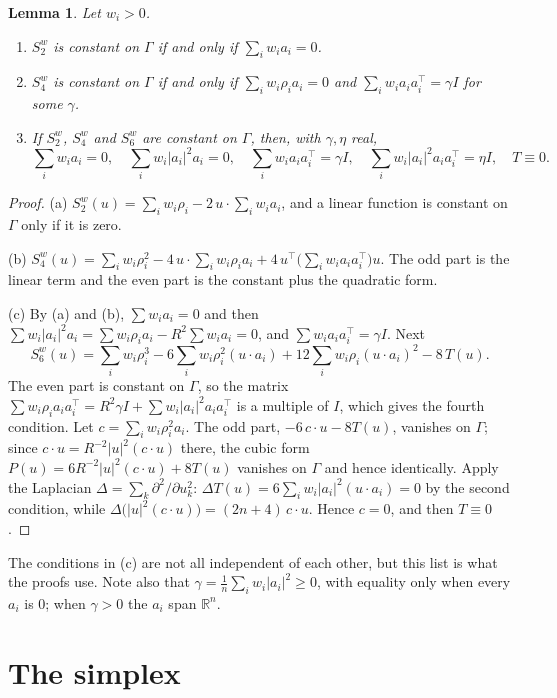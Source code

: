 \documentclass[11pt]{article}
\newtheorem{lemma}[theorem]{Lemma}
\theoremstyle{remark}
\begin{document}
\begin{lemma}\label{lem:moments}
Let $w_i>0$.
\begin{enumerate}
\item[(a)] $S^w_2$ is constant on $\Gamma$ if and only if $\sum_i w_ia_i=0$.
\item[(b)] $S^w_4$ is constant on $\Gamma$ if and only if $\sum_i w_i\rho_ia_i=0$ and $\sum_iw_ia_ia_i^{\top}=\gamma I$ for some $\gamma$.
\item[(c)] If $S^w_2$, $S^w_4$ and $S^w_6$ are constant on $\Gamma$, then, with $\gamma,\eta$ real,
\[
\sum_i w_ia_i=0,\quad \sum_i w_i|a_i|^2a_i=0,\quad \sum_iw_ia_ia_i^{\top}=\gamma I,\quad \sum_iw_i|a_i|^2a_ia_i^{\top}=\eta I,\quad T\equiv0 .
\]
\end{enumerate}
\end{lemma}

\begin{proof}
(a) $S^w_2(u)=\sum_iw_i\rho_i-2\,u\cdot\sum_iw_ia_i$, and a linear function is constant on $\Gamma$ only if it is zero.

(b) $S^w_4(u)=\sum_iw_i\rho_i^2-4\,u\cdot\sum_iw_i\rho_ia_i+4\,u^{\top}\bigl(\sum_iw_ia_ia_i^{\top}\bigr)u$. The odd part is the linear term and the even part is the constant plus the quadratic form.

(c) By (a) and (b), $\sum w_ia_i=0$ and then $\sum w_i|a_i|^2a_i=\sum w_i\rho_ia_i-R^2\sum w_ia_i=0$, and $\sum w_ia_ia_i^{\top}=\gamma I$. Next
\[
S^w_6(u)=\sum_iw_i\rho_i^3-6\sum_iw_i\rho_i^2(u\cdot a_i)+12\sum_iw_i\rho_i(u\cdot a_i)^2-8\,T(u).
\]
The even part is constant on $\Gamma$, so the matrix $\sum w_i\rho_ia_ia_i^{\top}=R^2\gamma I+\sum w_i|a_i|^2a_ia_i^{\top}$ is a multiple of $I$, which gives the fourth condition. Let $c=\sum_iw_i\rho_i^2a_i$. The odd part, $-6\,c\cdot u-8T(u)$, vanishes on $\Gamma$; since $c\cdot u=R^{-2}|u|^2(c\cdot u)$ there, the cubic form $P(u)=6R^{-2}|u|^2(c\cdot u)+8T(u)$ vanishes on $\Gamma$ and hence identically. Apply the Laplacian $\Delta=\sum_k\partial^2/\partial u_k^2$: $\Delta T(u)=6\sum_iw_i|a_i|^2(u\cdot a_i)=0$ by the second condition, while $\Delta\bigl(|u|^2(c\cdot u)\bigr)=(2n+4)\,c\cdot u$. Hence $c=0$, and then $T\equiv0$.
\end{proof}

The conditions in (c) are not all independent of each other, but this list is what the proofs use. Note also that $\gamma=\frac1n\sum_iw_i|a_i|^2\ge0$, with equality only when every $a_i$ is $0$; when $\gamma>0$ the $a_i$ span $\mathbb{R}^n$.

\section{The simplex}\label{sec:simplex}
\end{document}
